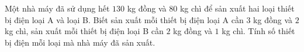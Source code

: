 \begin{bt}%
	Một nhà máy đã sử dụng hết $130$ kg đồng và $80$ kg chì để sản xuất hai loại thiết bị điện loại A và loại B. Biết sản xuất mỗi thiết bị điện loại A cần $3$ kg đồng và $2$ kg chì, sản xuất mỗi thiết bị điện loại B cần $2$ kg đồng và $1$ kg chì. Tính số thiết bị điện mỗi loại mà nhà máy đã sản xuất.
\end{bt}
